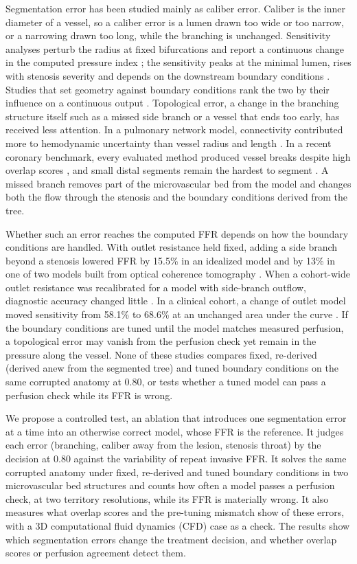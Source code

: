 \documentclass[journal,twoside,web]{ieeecolor}
\begin{document}
Segmentation error has been studied mainly as caliber error. Caliber is the inner diameter of a vessel, so a caliber error is a lumen drawn too wide or too narrow, or a narrowing drawn too long, while the branching is unchanged. Sensitivity analyses perturb the radius at fixed bifurcations and report a continuous change in the computed pressure index \cite{sankaran2015tmi,sankaran2015cmame,fernandez2024,dalmaso2025}; the sensitivity peaks at the minimal lumen, rises with stenosis severity \cite{fernandez2024} and depends on the downstream boundary conditions \cite{sankaran2015tmi}. Studies that set geometry against
boundary conditions rank the two by their influence on a continuous output \cite{sankaran2016,tanade2022,korte2023}. Topological error, a change in the branching structure itself such as a missed side branch or a vessel that ends too early, has received less attention. In a pulmonary network model, connectivity contributed more to hemodynamic uncertainty than vessel radius and
length \cite{colebank2019}. In a recent coronary benchmark, every evaluated method produced vessel breaks despite high overlap scores \cite{bransby2026}, and small distal segments remain the hardest to segment
\cite{chen2025}. A missed branch removes part of the microvascular bed from the model and changes both the flow
through the stenosis and the boundary conditions derived from the tree.

Whether such an error reaches the computed FFR depends on how the boundary conditions are handled. With outlet resistance held fixed, adding a side branch beyond a stenosis lowered FFR by 15.5\% in an idealized model and by 13\% in one of two models built from optical coherence tomography \cite{gamage2022}. When a cohort-wide outlet resistance was recalibrated for a model with side-branch outflow, diagnostic accuracy changed little \cite{gosling2020}. In a clinical cohort, a change of outlet model moved sensitivity from 58.1\% to 68.6\% at an unchanged area under
the curve \cite{fossan2026}. If the boundary conditions are tuned until the model matches measured perfusion, a topological error may vanish
from the perfusion check yet remain in the pressure along the vessel. None of these studies compares fixed, re-derived (derived anew from the segmented tree) and tuned boundary conditions on the same corrupted anatomy at
0.80, or tests whether a tuned model can pass a perfusion check while its FFR is wrong.

We propose a controlled test, an ablation that introduces one segmentation error at a time into an otherwise correct
model, whose FFR is the reference. It judges each error (branching, caliber away from the lesion, stenosis throat) by the decision at 0.80 against the variability of repeat invasive FFR. It solves the same corrupted anatomy under fixed, re-derived and tuned boundary conditions in two microvascular bed structures and counts how often a model passes a perfusion check, at two territory resolutions, while its FFR is materially wrong. It also measures what overlap scores and the pre-tuning mismatch show of these errors, with a 3D computational fluid
dynamics (CFD) case as a check. The results show which segmentation errors change the treatment decision, and whether overlap scores or perfusion
agreement detect them.
\end{document}
